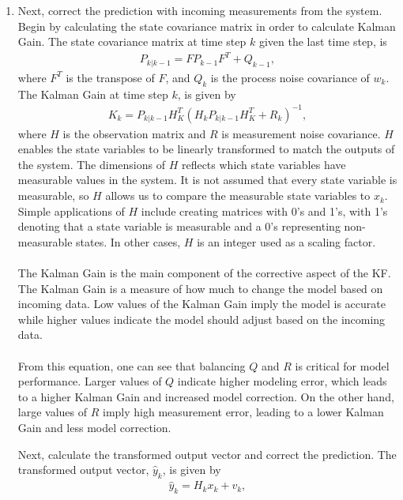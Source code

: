\begin{enumerate}
  \item Next, correct the prediction with incoming measurements from the system. Begin by calculating the state covariance matrix in order to calculate Kalman Gain. The state covariance matrix at time step $k$ given the last time step, is 
    \begin{align*} 
        P_{k | k -1} = F P_{k - 1} F^T + Q_{k-1}, 
    \end{align*}
    where $F^T$ is the transpose of $F$, and $Q_{k}$ is the process noise covariance of $w_k$.
    The Kalman Gain at time step $k$, is given by
    \begin{align*} 
        K_k = P_{k | k - 1} H^T_K (H_k P_{k | k - 1} H^T_K + R_k)^{-1},
    \end{align*}
      where $H$ is the observation matrix and $R$ is measurement noise covariance. 
      $H$ enables the state variables to be linearly transformed to match the outputs of the system. The dimensions of $H$ reflects which state variables have measurable values in the system. It is not assumed that every state variable is measurable, so $H$ allows us to compare the measurable state variables to $x_k$. Simple applications of $H$ include creating matrices with 0's and 1's, with 1's denoting that a state variable is measurable and a 0's representing non-measurable states. In other cases, $H$ is an integer used as a scaling factor. \\ \\
     The Kalman Gain is the main component of the corrective aspect of the KF. The Kalman Gain is a measure of how much to change the model based on incoming data. Low values of the Kalman Gain imply the model is accurate while higher values indicate the model should adjust based on the incoming data.  \\ \\
     From this equation, one can see that balancing $Q$ and $R$ is critical for model performance. Larger values of $Q$ indicate higher modeling error, which leads to a higher Kalman Gain and increased model correction. On the other hand, large values of $R$ imply high measurement error, leading to a lower Kalman Gain and less model correction. 
     
   
     Next, calculate the transformed output vector and correct the prediction. The transformed output vector, $\hat y_k$, is given by
    \begin{align*}
        \hat y_k = H_k x_k + v_k,
    \end{align*}
    

\end{enumerate}
